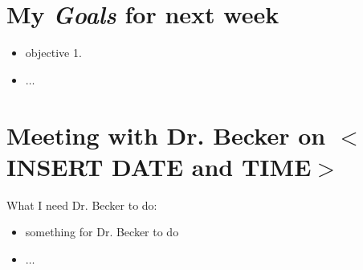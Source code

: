 \section{My \emph{Goals} for next week}

\begin{itemize}
\item objective 1. 
\item $\ldots$
\end{itemize}

\section{Meeting with Dr. Becker on $<$INSERT DATE and TIME$>$}

What I need Dr. Becker to do:
\begin{itemize}
\item something for Dr. Becker to do
\item $\ldots$
\end{itemize}


